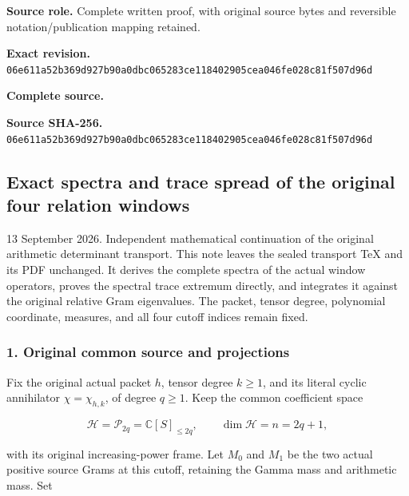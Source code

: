\documentclass{article}
\begin{document}
\maketitle
\begingroup
\sloppy
\small

\noindent\textbf{Source role.} Complete written proof, with original source bytes and reversible notation/publication mapping retained.\par
\noindent\textbf{Exact revision.} \nolinkurl{06e611a52b369d927b90a0dbc065283ce118402905cea046fe028c81f507d96d}\par
\noindent\textbf{Complete source.} \par
\noindent\textbf{Source SHA-256.} \nolinkurl{06e611a52b369d927b90a0dbc065283ce118402905cea046fe028c81f507d96d}\par\medskip
\subsection{Exact spectra and trace spread of the original four relation windows}\label{endpoint-window_review--exact-spectra-and-trace-spread-of-the-original-four-relation-windows}

13 September 2026. Independent mathematical continuation of the original arithmetic determinant transport. This note leaves the sealed transport TeX and its PDF unchanged. It derives the complete spectra of the actual window operators, proves the spectral trace extremum directly, and integrates it against the original relative Gram eigenvalues. The packet, tensor degree, polynomial coordinate, measures, and all four cutoff indices remain fixed.

\subsubsection{1. Original common source and projections}\label{endpoint-window_review--original-common-source-and-projections}

Fix the original actual packet \(h\), tensor degree \(k\ge1\), and its literal cyclic annihilator \(\chi=\chi_{h,k}\), of degree \(q\ge1\). Keep the common coefficient space

\[
\mathcal H=\mathcal P_{2q}=\mathbb C[S]_{\le2q},
\qquad \dim\mathcal H=n=2q+1,
\tag{WS1}
\]

with its original increasing-power frame. Let \(M_0\) and \(M_1\) be the two actual positive source Grams at this cutoff, retaining the Gamma mass and arithmetic mass. Set
\end{document}
